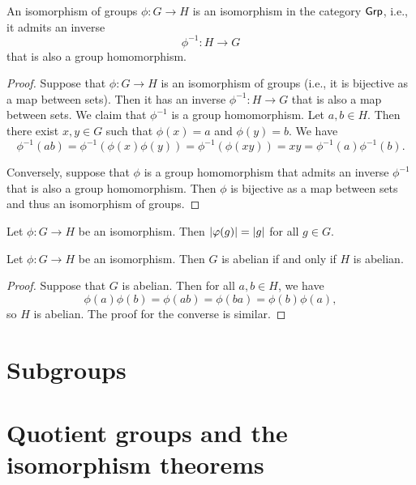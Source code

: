 \begin{theorem}
    An isomorphism of groups \(\phi: G \to H\) is an isomorphism in the category
    \(\mathsf{Grp}\), i.e., it admits an inverse
    \[
        \phi^{-1}: H \to G
    \]
    that is also a group homomorphism.
\end{theorem}

\begin{proof}
    Suppose that \(\phi: G \to H\) is an isomorphism of groups (i.e., it is
    bijective as a map between sets). Then it has an inverse \(\phi^{-1}: H \to
    G\) that is also a map between sets. We claim that \(\phi^{-1}\) is a group
    homomorphism. Let \(a, b \in H\). Then there exist \(x, y \in G\) such that
    \(\phi(x) = a\) and \(\phi(y) = b\). We have
    \[
        \phi^{-1}(ab) = \phi^{-1}(\phi(x)\phi(y)) = \phi^{-1}(\phi(xy)) = xy = \phi^{-1}(a)\phi^{-1}(b).
    \]
    
    Conversely, suppose that \(\phi\) is a group homomorphism that admits an
    inverse \(\phi^{-1}\) that is also a group homomorphism. Then \(\phi\) is
    bijective as a map between sets and thus an isomorphism of groups.
\end{proof}


\begin{theorem}
    Let \(\phi: G \to H\) be an isomorphism. Then \(\lvert \varphi(g) \rvert =
    \lvert g \rvert\) for all \(g \in G\).
\end{theorem}

\begin{theorem}
    Let \(\phi : G \to H\) be an isomorphism. Then \(G\) is abelian if and only
    if \(H\) is abelian.
\end{theorem}

\begin{proof}
    Suppose that \(G\) is abelian. Then for all \(a, b \in H\), we have
    \[
        \phi(a)\phi(b) = \phi(ab) = \phi(ba) = \phi(b)\phi(a),
    \]
    so \(H\) is abelian. The proof for the converse is similar.
\end{proof}

\section{Subgroups}


\clearpage
\section{Quotient groups and the isomorphism theorems}

